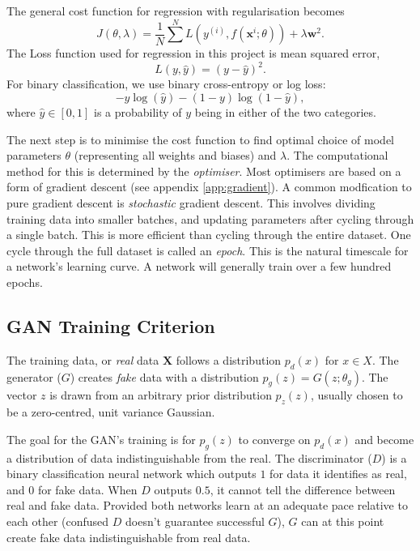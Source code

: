 \documentclass[12pt,a4paper]{article}
\begin{document}
The general cost function for regression with regularisation becomes
\begin{equation}
    J(\theta, \lambda) = \frac{1}{N}  \sum^N L(y^{(i)},  f(\mathbf{x}^{i}; \theta)) + \lambda \textbf{w}^2.
\end{equation}
The Loss function used for regression in this project is mean squared error,
\begin{equation} \label{eq:mse}
    L(y,\hat{y}) = (y-\hat{y})^2.
\end{equation}
For binary classification, we use binary cross-entropy or log loss:
\begin{equation}
-y \log(\hat{y}) - (1-y)\log (1-\hat{y}),
\end{equation}
where $\hat{y} \in [0,1]$ is a probability of $y$ being in either of the two categories.

The next step is to minimise the cost function to find optimal choice of model parameters $\theta$ 
(representing all weights and biases) and $\lambda$. The computational method for this is determined by the \emph{optimiser}. Most optimisers are based on a form of gradient descent (see appendix \ref{app:gradient}). A common modfication to pure gradient descent is \emph{stochastic} gradient descent. This involves dividing training data into smaller batches, and updating parameters after cycling through a single batch\cite{goodfellow_deep_2016}. This is more efficient than cycling through the entire dataset. One cycle through the full dataset is called an \emph{epoch}. This is the natural timescale for a network's learning curve. A network will generally train over a few hundred epochs.
\subsection{GAN Training Criterion}
The training data, or \emph{real} data $\textbf{X}$ follows a distribution $p_d(x)$ for $x\in X$. The generator ($G$) creates \emph{fake} data with a distribution $p_g(z) = G(z;\theta_g)$. The vector $z$ is drawn from an arbitrary prior distribution $p_z(z)$, usually chosen to be a zero-centred, unit variance Gaussian. 

The goal for the GAN's training is for $p_g(z)$ to converge on $p_d(x)$ and become a distribution of data indistinguishable from the real. The discriminator ($D$) is a binary classification neural network which outputs $1$ for data it identifies as real, and $0$ for fake data. When $D$ outputs $0.5$, it cannot tell the difference between real and fake data. Provided both networks learn at an adequate pace relative to each other (confused $D$ doesn't guarantee successful $G$), $G$ can at this point create fake data indistinguishable from real data. 
\end{document}

